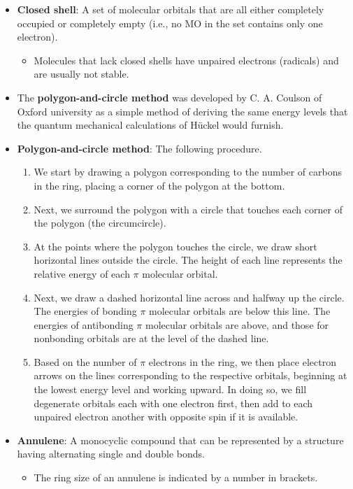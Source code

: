 \documentclass[../notes.tex]{subfiles}
\begin{document}
\begin{itemize}
    \item \textbf{Closed shell}: A set of molecular orbitals that are all either completely occupied or completely empty (i.e., no MO in the set contains only one electron).
    \begin{itemize}
        \item Molecules that lack closed shells have unpaired electrons (radicals) and are usually not stable.
    \end{itemize}
    \item The \textbf{polygon-and-circle method} was developed by C. A. Coulson of Oxford university as a simple method of deriving the same energy levels that the quantum mechanical calculations of H\"{u}ckel would furnish.
    \item \textbf{Polygon-and-circle method}: The following procedure.
    \begin{enumerate}
        \item We start by drawing a polygon corresponding to the number of carbons in the ring, placing a corner of the polygon at the bottom.
        \item Next, we surround the polygon with a circle that touches each corner of the polygon (the circumcircle).
        \item At the points where the polygon touches the circle, we draw short horizontal lines outside the circle. The height of each line represents the relative energy of each $\pi$ molecular orbital.
        \item Next, we draw a dashed horizontal line across and halfway up the circle. The energies of bonding $\pi$ molecular orbitals are below this line. The energies of antibonding $\pi$ molecular orbitals are above, and those for nonbonding orbitals are at the level of the dashed line.
        \item Based on the number of $\pi$ electrons in the ring, we then place electron arrows on the lines corresponding to the respective orbitals, beginning at the lowest energy level and working upward. In doing so, we fill degenerate orbitals each with one electron first, then add to each unpaired electron another with opposite spin if it is available.
    \end{enumerate}
    \item \textbf{Annulene}: A monocyclic compound that can be represented by a structure having alternating single and double bonds.
    \begin{itemize}
        \item The ring size of an annulene is indicated by a number in brackets.

\end{itemize}
\end{itemize}
\end{document}

